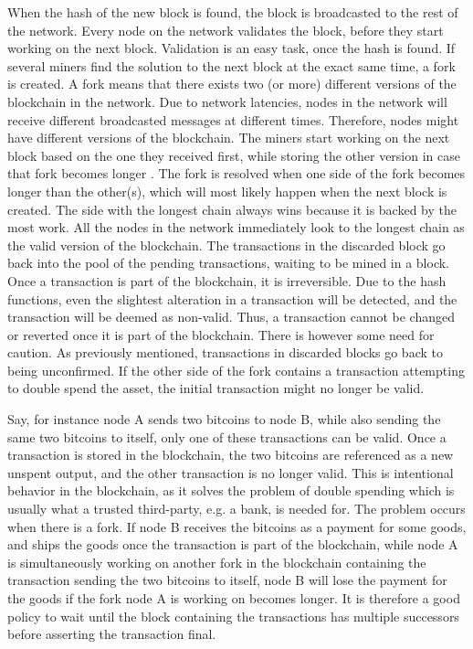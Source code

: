 When the hash of the new block is found, the block is broadcasted to the rest of the network. Every node on the network validates the block, before they start working on the next block. Validation is an easy task, once the hash is found. If several miners find the solution to the next block at the exact same time, a fork is created. 
A fork means that there exists  two (or more) different versions of the blockchain in the network. Due to network latencies, nodes in the network will receive different broadcasted messages at different times. Therefore, nodes might have different versions of the blockchain. The miners start working on the next block based on the one they received first, while storing the other version in case that fork becomes longer \cite{Nakamoto_bitcoin}. The fork is resolved when one side of the fork becomes longer than the other(s), which will most likely happen when the next block is created. The side with the longest chain always wins because it is backed by the most work. All the nodes in the network immediately look to the longest chain as the valid version of the blockchain. The transactions in the discarded block go back into the pool of the pending transactions, waiting to be mined in a block. Once a transaction is part of the blockchain, it is irreversible. Due to the hash functions, even the slightest alteration in a transaction will be detected, and the transaction will be deemed as non-valid. Thus, a transaction cannot be changed or reverted once it is part of the blockchain. There is however some need for caution. As previously mentioned, transactions in discarded blocks go back to being unconfirmed. If the other side of the fork contains a transaction attempting to double spend the asset, the initial transaction might no longer be valid. 

Say, for instance node A sends two bitcoins to node B, while also sending the same two bitcoins to itself, only one of these transactions can be valid. Once a transaction is stored in the blockchain, the two bitcoins are referenced as a new unspent output, and the other transaction is no longer valid. This is intentional behavior in the blockchain, as it solves the problem of double spending which is usually what a trusted third-party, e.g. a bank, is needed for. The problem occurs when there is a fork. If node B receives the bitcoins as a payment for some goods, and ships the goods once the transaction is part of the blockchain, while node A is simultaneously working on another fork in the blockchain containing the transaction sending the two bitcoins to itself, node B will lose the payment for the goods if the fork node A is working on becomes longer. It is therefore a good policy to wait until the block containing the transactions has multiple successors before asserting the transaction final.


